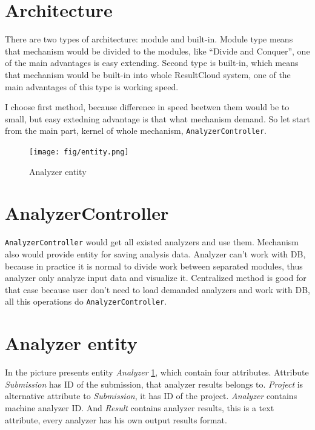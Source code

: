 \section{Architecture} 

There are two types of architecture: module and built-in. Module type means that mechanism would be divided to the modules, like “Divide and Conquer”, one of the main advantages is easy extending. Second type is built-in, which means that mechanism would be built-in into whole ResultCloud system, one of the main advantages of this type is working speed.

I choose first method, because difference in speed beetwen them would be to small, but easy extedning advantage is that what mechanism demand. So let start from the main part, kernel of whole mechanism, \texttt{AnalyzerController}. 

\begin{figure}
  \centering
    \texttt{[image: fig/entity.png]}
  \caption{Analyzer entity}
  \label{fig:entity}
\end{figure}

\section{AnalyzerController}

\texttt{AnalyzerController} would get all existed analyzers and use them. Mechanism also would provide entity for saving analysis data. Analyzer can't work with DB, because in practice it is normal to divide work between separated modules, thus analyzer only analyze input data and visualize it. Centralized method is good for that case because user don't need to load demanded analyzers and work with DB, all this operations do \texttt{AnalyzerController}.

\section{Analyzer entity}

In the picture presents entity \emph{Analyzer} \ref{fig:entity}, which contain four attributes. Attribute \emph{Submission} has ID of the submission, that analyzer results belongs to. \emph{Project} is alternative attribute to \emph{Submission}, it has ID of the project. \emph{Analyzer} contains machine analyzer ID. And \emph{Result} contains analyzer results, this is a text attribute, every analyzer has his own output results format.

